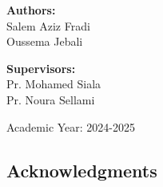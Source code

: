 \documentclass[10pt,a4paper]{article} %
\begin{document}
\begin{titlepage}
\begin{center}
\begin{minipage}{0.6\textwidth}
            {\large\bfseries Authors:} \\
            \vspace{0.1cm}
            {\large Salem Aziz Fradi} \\ %
            {\large Oussema Jebali} %
            
            \vspace{1.2cm} %
            
            {\large\bfseries Supervisors:} \\ %
            \vspace{0.1cm}
            {\large Pr. Mohamed Siala} \\ %
            {\large Pr. Noura Sellami} %
        \end{minipage}
    \end{center}

    \vfill %

    \centering
    {\large Academic Year: 2024-2025}
    
    \restoregeometry %
\end{titlepage}

\cleardoublepage %


\pagestyle{empty} %

\vspace*{2cm} %

\begin{center}
    \section*{Acknowledgments} %
\end{center}

\vspace{1cm} %
\end{document}
